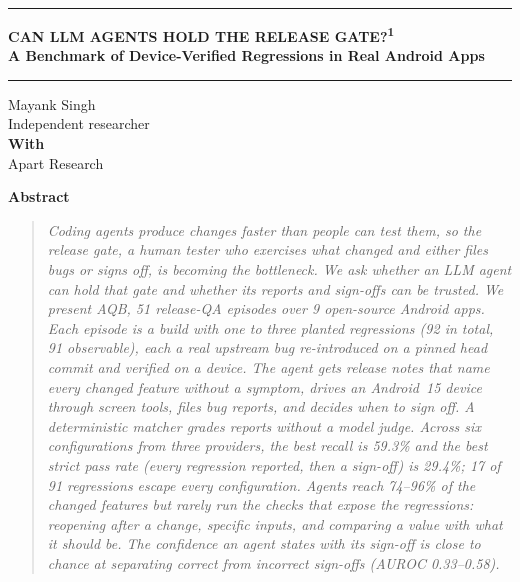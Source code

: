 \documentclass[10pt,letterpaper]{article}
\newcommand{\aqb}{AQB\xspace}
\begin{document}
\noindent\rule{\textwidth}{2.2pt}\par\vspace{10pt}
\begin{center}
{\LARGE\bfseries CAN LLM AGENTS HOLD THE RELEASE GATE?\textsuperscript{1}}\\[4pt]
{\large\bfseries A Benchmark of Device-Verified Regressions in Real Android Apps}
\end{center}
\vspace{2pt}\noindent\rule{\textwidth}{0.5pt}\par\vspace{8pt}
\begin{center}
Mayank Singh\\ Independent researcher\\[5pt]
{\bfseries With}\\Apart Research
\end{center}
\vspace{2pt}
\begin{center}{\large\bfseries Abstract}\end{center}\vspace{-4pt}
\begin{quote}\itshape\small
Coding agents produce changes faster than people can test them, so the release gate, a human tester
who exercises what changed and either files bugs or signs off, is becoming the bottleneck. We ask
whether an LLM agent can hold that gate and whether its reports and sign-offs can be trusted. We
present \aqb, 51 release-QA episodes over 9 open-source Android apps. Each episode is a build with one
to three planted regressions (92 in total, 91 observable), each a real upstream bug re-introduced on a
pinned head commit and verified on a device. The agent gets release notes that name every changed
feature without a symptom, drives an Android~15 device through screen tools, files bug reports, and
decides when to sign off. A deterministic matcher grades reports without a model judge. Across six
configurations from three providers, the best recall is 59.3\% and the best strict pass rate (every
regression reported, then a sign-off) is 29.4\%; 17 of 91 regressions escape every configuration.
Agents reach 74--96\% of the changed features but rarely run the checks that expose the regressions:
reopening after a change, specific inputs, and comparing a value with what it should be. The
confidence an agent states with its sign-off is close to chance at separating correct from incorrect
sign-offs (AUROC 0.33--0.58).
\end{quote}
\end{document}

